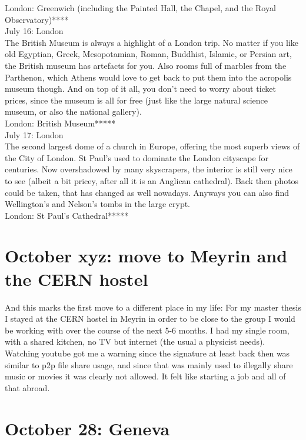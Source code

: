 London: Greenwich (including the Painted Hall, the Chapel, and the Royal Observatory)****\\

July 16: London\\
The British Museum is always a highlight of a London trip. No matter if you like old Egyptian, Greek, Mesopotamian, Roman, Buddhist, Islamic, or Persian art, the British museum has artefacts for you. Also rooms full of marbles from the Parthenon, which Athens would love to get back to put them into the acropolis museum though. And on top of it all, you don't need to worry about ticket prices, since the museum is all for free (just like the large natural science museum, or also the national gallery).\\

London: British Museum*****\\

July 17: London\\
The second largest dome of a church in Europe, offering the most superb views of the City of London. St Paul's used to dominate the London cityscape for centuries. Now overshadowed by many skyscrapers, the interior is still very nice to see (albeit a bit pricey, after all it is an Anglican cathedral). Back then photos could be taken, that has changed as well nowadays. Anyways you can also find Wellington's and Nelson's tombs in the large crypt.\\

London: St Paul's Cathedral*****

\section{October xyz: move to Meyrin and the CERN hostel}
\label{moveMeyrin}

And this marks the first move to a different place in my life: For my master thesis I stayed at the CERN hostel in Meyrin in order to be close to the group I would be working with over the course of the next 5-6 months. I had my single room, with a shared kitchen, no TV but internet (the usual a physicist needs). Watching youtube got me a warning since the signature at least back then was similar to p2p file share usage, and since that was mainly used to illegally share music or movies it was clearly not allowed. It felt like starting a job and all of that abroad.

\section{October 28: Geneva}
\label{2006:Geneva}

